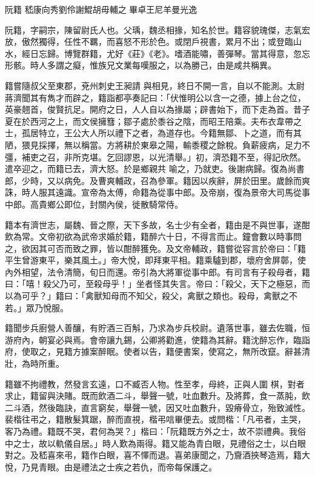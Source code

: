 
\begin{pinyinscope}
阮籍
 嵇康向秀劉伶謝鯤胡毋輔之
 畢卓王尼羊曼光逸



 阮籍，字嗣宗，陳留尉氏人也。父瑀，魏丞相掾，知名於世。籍容貌瑰傑，志氣宏放，傲然獨得，任性不羈，而喜怒不形於色。或閉戶視書，累月不出；或登臨山水，經日忘歸。博覽群籍，尤好《莊》《老》。嗜酒能嘯，善彈琴。當其得意，忽忘形骸。時人多謂之癡，惟族兄文業每嘆服之，以為勝己，由是咸共稱異。



 籍嘗隨叔父至東郡，兗州刺史王昶請
 與相見，終日不開一言，自以不能測。太尉蔣濟聞其有雋才而辟之，籍詣都亭奏記曰：「伏惟明公以含一之德，據上台之位，英豪翹首，俊賢抗足。開府之日，人人自以為掾屬；辟書始下，而下走為首。昔子夏在於西河之上，而文侯擁篲；鄒子處於黍谷之陰，而昭王陪乘。夫布衣韋帶之士，孤居特立，王公大人所以禮下之者，為道存也。今籍無鄒、卜之道，而有其陋，猥見採擇，無以稱當。方將耕於東皋之陽，輸黍稷之餘稅。負薪疲病，足力不彊，補吏之召，非所克堪。乞回謬恩，以光清舉。」初，濟恐籍不至，得記欣然。遣卒迎之，而籍已去，濟大怒。於是鄉親共
 喻之，乃就吏。後謝病歸。復為尚書郎，少時，又以病免。及曹爽輔政，召為參軍。籍因以疾辭，屏於田里。歲餘而爽誅，時人服其遠識。宣帝為太傅，命籍為從事中郎。及帝崩，復為景帝大司馬從事中郎。高貴鄉公即位，封關內侯，徙散騎常侍。



 籍本有濟世志，屬魏、晉之際，天下多故，名士少有全者，籍由是不與世事，遂酣飲為常。文帝初欲為武帝求婚於籍，籍醉六十日，不得言而止。鐘會數以時事問之，欲因其可否而致之罪，皆以酣醉獲免。及文帝輔政，籍嘗從容言於帝曰：「籍平生曾游東平，樂其風土。」帝大悅，即拜東平相。籍乘驢到郡，壞府舍屏鄣，使
 內外相望，法令清簡，旬日而還。帝引為大將軍從事中郎。有司言有子殺母者，籍曰：「嘻！殺父乃可，至殺母乎！」坐者怪其失言。帝曰：「殺父，天下之極惡，而以為可乎？」籍曰：「禽獸知母而不知父，殺父，禽獸之類也。殺母，禽獸之不若。」眾乃悅服。



 籍聞步兵廚營人善釀，有貯酒三百斛，乃求為步兵校尉。遺落世事，雖去佐職，恒游府內，朝宴必與焉。會帝讓九錫，公卿將勸進，使籍為其辭。籍沈醉忘作，臨詣府，使取之，見籍方據案醉眠。使者以告，籍便書案，使寫之，無所改竄。辭甚清壯，為時所重。



 籍雖不拘禮教，然發言玄遠，口不臧否人物。性至孝，母終，正與人圍
 棋，對者求止，籍留與決賭。既而飲酒二斗，舉聲一號，吐血數升。及將葬，食一蒸肫，飲二斗酒，然後臨訣，直言窮矣，舉聲一號，因又吐血數升，毀瘠骨立，殆致滅性。裴楷往弔之，籍散髮箕踞，醉而直視，楷弔唁畢便去。或問楷：「凡弔者，主哭，客乃為禮。籍既不哭，君何為哭？」楷曰：「阮籍既方外之士，故不崇禮典。我俗中之士，故以軌儀自居。」時人歎為兩得。籍又能為青白眼，見禮俗之士，以白眼對之。及嵇喜來弔，籍作白眼，喜不懌而退。喜弟康聞之，乃齎酒挾琴造焉，籍大悅，乃見青眼。由是禮法之士疾之若仇，而帝每保護之。




\end{pinyinscope}
